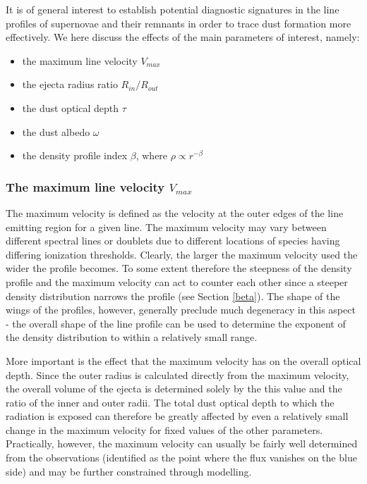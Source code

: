 \documentclass[useAMS,usenatbib,usegraphicx]{mnras}
\begin{document}
It is of general interest to establish potential diagnostic signatures in 
the line profiles of supernovae and their remnants in order to trace dust 
formation more effectively.  We here discuss the effects of the main 
parameters of interest, namely:

\begin{itemize}
\item the maximum line velocity $V_{max}$
\item the ejecta radius ratio  $R_{in}/R_{out}$
\item the dust optical depth $\tau$
\item the dust albedo $\omega$ 
\item the density profile index $\beta$, where $\rho \propto r^{-\beta}$
\end{itemize}


\subsubsection{The maximum line velocity $V_{max}$}

The maximum velocity is defined as the velocity at the outer edges of 
the line emitting region for a given line.  The 
maximum velocity may vary between different spectral lines or doublets due 
to different locations of  species having differing ionization 
thresholds.  Clearly, the larger the maximum velocity used the wider the 
profile becomes.  To some extent therefore the steepness of the density 
profile and the maximum velocity can act to counter each other since a steeper 
density distribution narrows the profile (see Section \ref{beta}).  The shape 
of the wings of the profiles, however, generally preclude much degeneracy 
in this aspect - the overall shape of the line profile can be used to determine the 
exponent of the density distribution to within a relatively small range.

More important is the effect that the maximum velocity has on the overall 
optical depth.  Since the outer radius is calculated directly from the maximum velocity, the overall volume of the ejecta is determined 
solely by the this value and the ratio of the inner and outer radii.  
The total dust optical depth to which the radiation is exposed can therefore be greatly affected by even a relatively small change in the maximum velocity for fixed values of the other parameters.  
Practically, however, the maximum velocity can usually be fairly well determined 
from the observations (identified as the point where the flux vanishes 
on the blue side) and may be further constrained through modelling.
\end{document}
